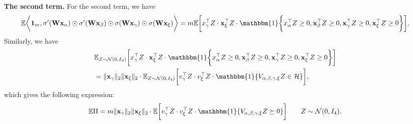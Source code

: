 {\bf The second term.} For the second term, we have
\[
	\bbE \bigg\la \mathbf{1}_m, \sigma'(\rmW \rvx_\alpha) \odot \sigma'(\rmW \rvx_\beta) \odot \sigma(\rmW \rvx_\gamma) \odot \sigma(\rmW \rvx_\xi)  \bigg\ra  = m \bbE \bigg[x_\gamma^\top Z\cdot\rvx_\xi^\top Z\cdot \mathbbm{1}\bigg\{x_\alpha^\top Z \geq 0,\rvx_\beta^\top Z \geq 0,\rvx_\gamma^\top Z \geq 0,\rvx_\xi^\top Z \geq 0\bigg\}\bigg].
\]
Similarly, we have
\begin{align*}
	& \bbE_{Z\sim\calN(0, I_d)} \bigg[x_\gamma^\top Z\cdot\rvx_\xi^\top Z\cdot \mathbbm{1}\bigg\{x_\alpha^\top Z \geq 0,\rvx_\beta^\top Z \geq 0,\rvx_\gamma^\top Z \geq 0,\rvx_\xi^\top Z \geq 0\bigg\}\bigg] \\
	& =  \|\rvx_\gamma\|_2 \|\rvx_\xi \|_2\cdot \bbE_{Z\sim\calN(0, I_4)} \bigg[v_\gamma^\top Z \cdot v_\xi^\top Z \cdot \mathbbm{1}\{V_{\alpha, \beta, \gamma, \xi}Z \in \calH\}\bigg],
\end{align*}	
which gives the following expression:
\[
	\bbE \RN{2} = m \|\rvx_\gamma\|_2 \|\rvx_\xi \|_2\cdot \bbE \bigg[v_\gamma^\top Z \cdot v_\xi^\top Z \cdot \mathbbm{1}\{V_{\alpha, \beta, \gamma, \xi}Z \succeq 0\}\bigg] \qquad Z\sim\calN(0, I_4).
\]
~\\

